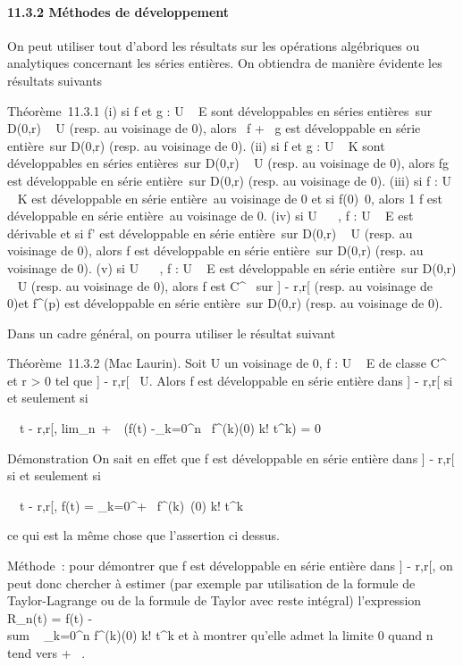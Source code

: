 \documentclass[]{article}
\begin{document}
\paragraph{11.3.2 Méthodes de développement}

On peut utiliser tout d'abord les résultats sur les opérations
algébriques ou analytiques concernant les séries entières. On obtiendra
de manière évidente les résultats suivants

Théorème~11.3.1 (i) si f et g : U \rightarrow~ E sont développables en séries
entières~sur D(0,r) \subset~ U (resp. au voisinage de 0), alors \alpha~f + \beta~g est
développable en série entière~sur D(0,r) (resp. au voisinage de 0). (ii)
si f et g : U \rightarrow~ K sont développables en séries entières~sur D(0,r) \subset~ U
(resp. au voisinage de 0), alors fg est développable en série
entière~sur D(0,r) (resp. au voisinage de 0). (iii) si f : U \rightarrow~ K est
développable en série entière~au voisinage de 0 et si
f(0)\neq~0, alors  1 \over f
est développable en série entière~au voisinage de 0. (iv) si U \subset~ ~, f :
U \rightarrow~ E est dérivable et si f' est développable en série entière~sur
D(0,r) \subset~ U (resp. au voisinage de 0), alors f est développable en série
entière~sur D(0,r) (resp. au voisinage de 0). (v) si U \subset~ ~, f : U \rightarrow~ E
est développable en série entière~sur D(0,r) \subset~ U (resp. au voisinage de
0), alors f est C^\infty~ sur {]} - r,r{[} (resp. au voisinage de
0)et f^(p) est développable en série entière~sur D(0,r)
(resp. au voisinage de 0).

Dans un cadre général, on pourra utiliser le résultat suivant

Théorème~11.3.2 (Mac Laurin). Soit U un voisinage de 0, f : U \rightarrow~ E de
classe C^\infty~ et r \textgreater{} 0 tel que {]} - r,r{[}\subset~ U.
Alors f est développable en série entière dans {]} - r,r{[} si et
seulement si

\forall~~t \in{]} - r,r{[},
lim_n\rightarrow~+\infty~~\left (f(t)
-\sum _k=0^n~
f^(k)(0) \over k!
t^k\right ) = 0

Démonstration On sait en effet que f est développable en série entière
dans {]} - r,r{[} si et seulement si

\forall~~t \in{]} - r,r{[}, f(t) =
\sum _k=0^+\infty~ f^(k)~(0)
\over k! t^k

ce qui est la même chose que l'assertion ci dessus.

Méthode~: pour démontrer que f est développable en série entière dans
{]} - r,r{[}, on peut donc chercher à estimer (par exemple par
utilisation de la formule de Taylor-Lagrange ou de la formule de Taylor
avec reste intégral) l'expression R_n(t) = f(t)
-\\sum ~
_k=0^n f^(k)(0) \over k!
t^k et à montrer qu'elle admet la limite 0 quand n tend vers
+ \infty~.
\end{document}
